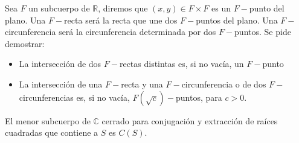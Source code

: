 \begin{ejercicio} %
    Sea $F$ un subcuerpo de $\mathbb{R}$, diremos que $(x,y)\in F\times F$ es un $F-$punto del plano. Una $F-$recta será la recta que une dos $F-$puntos del plano. Una $F-$circunferencia será la circunferencia determinada por dos $F-$puntos. Se pide demostrar:
    \begin{itemize}
        \item La intersección de dos $F-$rectas distintas es, si no vacía, un $F-$punto
        \item La intersección de una $F-$recta y una $F-$circunferencia o de dos $F-$circunferencias es, si no vacía, $F(\sqrt{c})-$puntos, para $c>0$.
    \end{itemize}
\end{ejercicio}

\begin{teo}
    El menor subcuerpo de $\mathbb{C}$ cerrado para conjugación y extracción de raíces cuadradas que contiene a $S$ es $C(S)$.
\end{teo}

